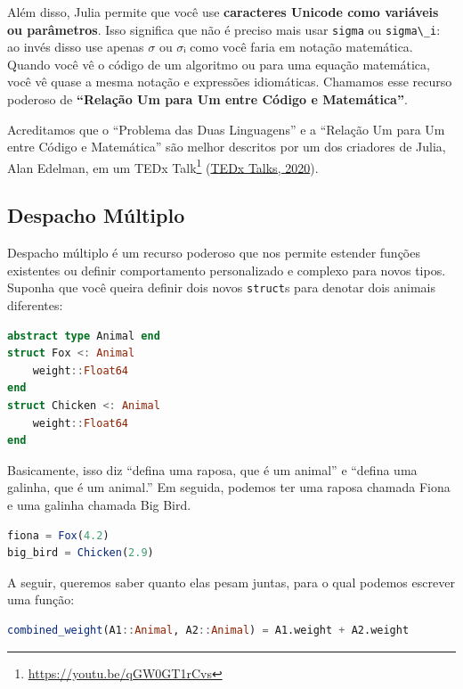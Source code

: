 \documentclass[
  notoc %
]{tufte-book}
\DeclareRobustCommand{\href}[2]{#2\footnote{\url{#1}}}
\newcommand{\passthrough}[1]{#1}
\begin{document}
Além disso, Julia permite que você use \textbf{caracteres Unicode como
variáveis ou parâmetros}. Isso significa que não é preciso mais usar
\passthrough{\lstinline!sigma!} ou \passthrough{\lstinline!sigma\_i!}:
ao invés disso use apenas \(σ\) ou \(σᵢ\) como você faria em notação
matemática. Quando você vê o código de um algoritmo ou para uma equação
matemática, você vê quase a mesma notação e expressões idiomáticas.
Chamamos esse recurso poderoso de \textbf{``Relação Um para Um entre
Código e Matemática''}.

Acreditamos que o ``Problema das Duas Linguagens'' e a ``Relação Um para
Um entre Código e Matemática'' são melhor descritos por um dos criadores
de Julia, Alan Edelman, em um \href{https://youtu.be/qGW0GT1rCvs}{TEDx
Talk} (\protect\hyperlink{ref-tedxtalksProgrammingLanguageHeal2020}{TEDx
Talks, 2020}).

\hypertarget{sec:multiple_dispatch}{%
\subsection{Despacho Múltiplo}\label{sec:multiple_dispatch}}

Despacho múltiplo é um recurso poderoso que nos permite estender funções
existentes ou definir comportamento personalizado e complexo para novos
tipos. Suponha que você queira definir dois novos
\passthrough{\lstinline!struct!}s para denotar dois animais diferentes:

\begin{lstlisting}[language=Julia]
abstract type Animal end
struct Fox <: Animal
    weight::Float64
end
struct Chicken <: Animal
    weight::Float64
end
\end{lstlisting}

Basicamente, isso diz ``defina uma raposa, que é um animal'' e ``defina
uma galinha, que é um animal.'' Em seguida, podemos ter uma raposa
chamada Fiona e uma galinha chamada Big Bird.

\begin{lstlisting}[language=Julia]
fiona = Fox(4.2)
big_bird = Chicken(2.9)
\end{lstlisting}

A seguir, queremos saber quanto elas pesam juntas, para o qual podemos
escrever uma função:

\begin{lstlisting}[language=Julia]
combined_weight(A1::Animal, A2::Animal) = A1.weight + A2.weight
\end{lstlisting}
\end{document}
